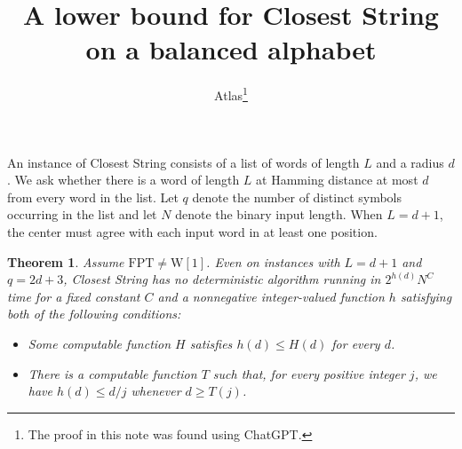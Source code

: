 \documentclass[11pt]{article}
\title{A lower bound for Closest String on a balanced alphabet}
\author{Atlas\thanks{The proof in this note was found using ChatGPT.}}
\date{}
\newtheorem{theorem}{Theorem}
\begin{document}
\maketitle

An instance of Closest String consists of a list of words of length \(L\)
and a radius \(d\). We ask whether there is a word of length \(L\) at
Hamming distance at most \(d\) from every word in the list. Let \(q\)
denote the number of distinct symbols occurring in the list and let
\(N\) denote the binary input length. When \(L=d+1\), the center must
agree with each input word in at least one position.

\hypertarget{cs-balanced}{}\begin{theorem}\label{cs-balanced}
Assume \(\mathrm{FPT}\ne\mathrm{W[1]}\). Even on instances with
\(L=d+1\) and \(q=2d+3\), Closest String has no deterministic algorithm
running in \(2^{h(d)}N^C\) time for a fixed constant \(C\) and a
nonnegative integer-valued function \(h\) satisfying both of the
following conditions:
\begin{itemize}
\item Some computable function \(H\) satisfies \(h(d)\le H(d)\) for every \(d\).
\item There is a computable function \(T\) such that, for every positive
integer \(j\), we have \(h(d)\le d/j\) whenever \(d\ge T(j)\).
\end{itemize}
\end{theorem}
\end{document}
